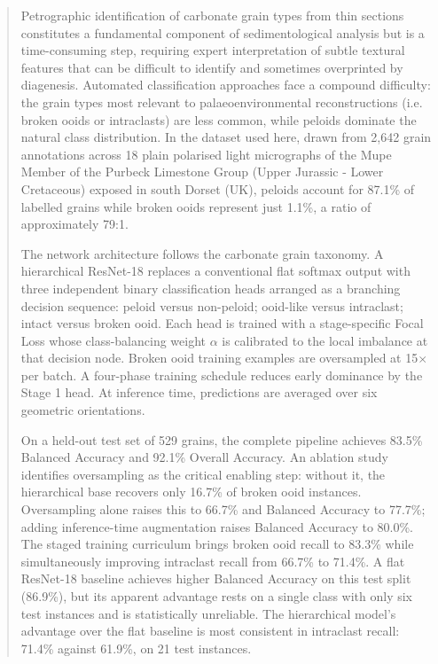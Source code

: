 \documentclass[a4paper,fleqn]{cas-dc}
\begin{document}
\begin{abstract}
Petrographic identification of carbonate grain types from thin sections constitutes a fundamental component of sedimentological analysis but is a time-consuming step, requiring expert interpretation of subtle textural features that can be difficult to identify and sometimes overprinted by diagenesis. Automated classification approaches face a compound difficulty: the grain types most relevant to palaeoenvironmental reconstructions (i.e. broken ooids or intraclasts) are less common, while peloids dominate the natural class distribution. In the dataset used here, drawn from 2,642 grain annotations across 18 plain polarised light micrographs of the Mupe Member of the Purbeck Limestone Group (Upper Jurassic - Lower Cretaceous) exposed in south Dorset (UK), peloids account for 87.1\% of labelled grains while broken ooids represent just 1.1\%, a ratio of approximately 79:1.

The network architecture follows the carbonate grain taxonomy. A hierarchical ResNet-18 replaces a conventional flat softmax output with three independent binary classification heads arranged as a branching decision sequence: peloid versus non-peloid; ooid-like versus intraclast; intact versus broken ooid. Each head is trained with a stage-specific Focal Loss whose class-balancing weight $\alpha$ is calibrated to the local imbalance at that decision node. Broken ooid training examples are oversampled at 15$\times$ per batch. A four-phase training schedule reduces early dominance by the Stage 1 head. At inference time, predictions are averaged over six geometric orientations.

On a held-out test set of 529 grains, the complete pipeline achieves 83.5\% Balanced Accuracy and 92.1\% Overall Accuracy. An ablation study identifies oversampling as the critical enabling step: without it, the hierarchical base recovers only 16.7\% of broken ooid instances. Oversampling alone raises this to 66.7\% and Balanced Accuracy to 77.7\%; adding inference-time augmentation raises Balanced Accuracy to 80.0\%. The staged training curriculum brings broken ooid recall to 83.3\% while simultaneously improving intraclast recall from 66.7\% to 71.4\%. A flat ResNet-18 baseline achieves higher Balanced Accuracy on this test split (86.9\%), but its apparent advantage rests on a single class with only six test instances and is statistically unreliable. The hierarchical model's advantage over the flat baseline is most consistent in intraclast recall: 71.4\% against 61.9\%, on 21 test instances.
\end{abstract}
\end{document}
